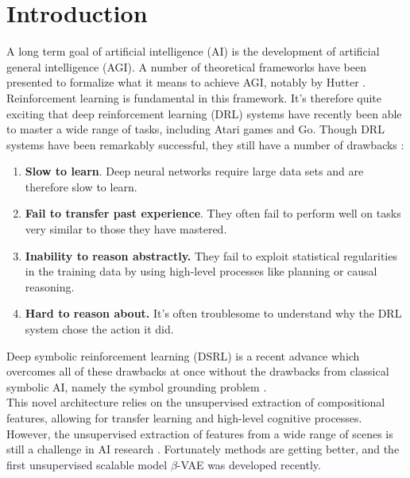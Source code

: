 \documentclass[12pt,twoside]{article}
\begin{document}

\newpage

\tableofcontents
\newpage

 

\section{Introduction}
A long term goal of artificial intelligence (AI) is the development of artificial general intelligence (AGI). A number of theoretical frameworks have been presented to formalize what it means to achieve AGI, notably by Hutter \cite{Hutter2005}.\\

Reinforcement learning is fundamental in this framework. It's therefore quite exciting that deep reinforcement learning (DRL) systems have recently been able to master a wide range of tasks, including Atari games and Go. Though DRL systems have been remarkably successful, they still have a number of drawbacks \cite{Garnelo2016}:

\begin{enumerate}
\item \textbf{Slow to learn}. Deep neural networks require large data sets and are therefore slow to learn.
\item \textbf{Fail to transfer past experience}. They often fail to perform well on tasks very similar to those they have mastered.
\item \textbf{Inability to reason abstractly.} They fail to exploit statistical regularities in the training data by using high-level processes like planning or causal reasoning.
\item \textbf{Hard to reason about.} It's often troublesome to understand why the DRL system chose the action it did.
\end{enumerate}

Deep symbolic reinforcement learning (DSRL) is a recent advance which overcomes all of these drawbacks at once without the drawbacks from classical symbolic AI, namely the symbol grounding problem \cite{Garnelo2016}.\\

This novel architecture relies on the unsupervised extraction of compositional features, allowing for transfer learning and high-level cognitive processes. However, the unsupervised extraction of features from a wide range of scenes is still a challenge in AI research \cite{Bengio2013}. Fortunately methods are getting better, and the first unsupervised scalable model $\beta$-VAE was developed recently. \\
\end{document}

